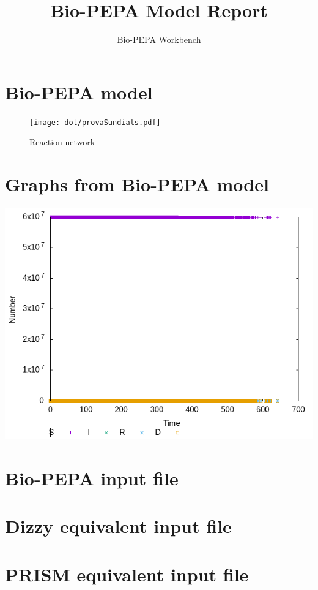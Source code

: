 \documentclass{llncs}
\title{Bio-PEPA Model Report}
\author{Bio-PEPA Workbench}
\institute{\today}
\begin{document}
\maketitle
\section{Bio-PEPA model}

\begin{figure}[htbp]
\begin{center}
\texttt{[image: dot/provaSundials.pdf]}
\caption{Reaction network}
\end{center}
\end{figure}
\newpage
\section{Graphs from Bio-PEPA model}
\includegraphics[scale=0.5]{png/provaSundials001_stochkit_results_0}
\appendix
\newpage
\section{Bio-PEPA input file}

\newpage
\section{Dizzy equivalent input file}

\newpage
\section{PRISM equivalent input file}

\end{document}
